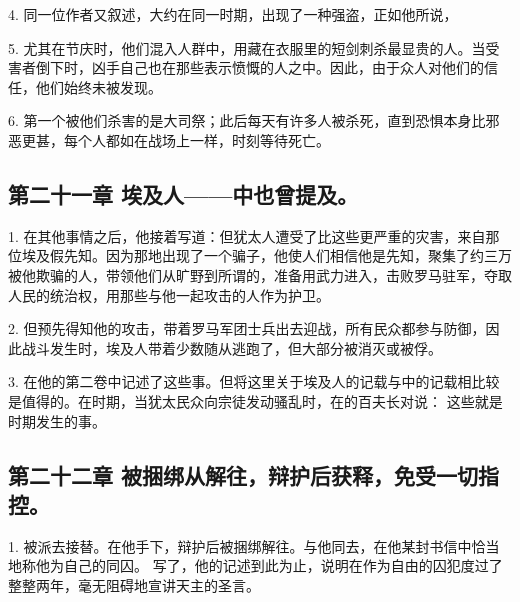 4. 同一位作者又叙述，大约在同一时期，出现了一种强盗，正如他所说，\par

5. 尤其在节庆时，他们混入人群中，用藏在衣服里的短剑刺杀最显贵的人。当受害者倒下时，凶手自己也在那些表示愤慨的人之中。因此，由于众人对他们的信任，他们始终未被发现。\par

6. 第一个被他们杀害的是大司祭；此后每天有许多人被杀死，直到恐惧本身比邪恶更甚，每个人都如在战场上一样，时刻等待死亡。\par


\subsection{第二十一章 埃及人——中也曾提及。}

1. 在其他事情之后，他接着写道：但犹太人遭受了比这些更严重的灾害，来自那位埃及假先知。因为那地出现了一个骗子，他使人们相信他是先知，聚集了约三万被他欺骗的人，带领他们从旷野到所谓的，准备用武力进入，击败罗马驻军，夺取人民的统治权，用那些与他一起攻击的人作为护卫。\par

2. 但预先得知他的攻击，带着罗马军团士兵出去迎战，所有民众都参与防御，因此战斗发生时，埃及人带着少数随从逃跑了，但大部分被消灭或被俘。\par

3. 在他的第二卷中记述了这些事。但将这里关于埃及人的记载与中的记载相比较是值得的。在时期，当犹太民众向宗徒发动骚乱时，在的百夫长对说：  这些就是时期发生的事。\par


\subsection{第二十二章 被捆绑从解往，辩护后获释，免受一切指控。}

1. 被派去接替。在他手下，辩护后被捆绑解往。与他同去，在他某封书信中恰当地称他为自己的同囚。  写了，他的记述到此为止，说明在作为自由的囚犯度过了整整两年，毫无阻碍地宣讲天主的圣言。\par

